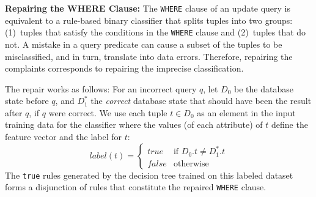\noindent
\textbf{Repairing the WHERE Clause:}
The \texttt{WHERE} clause of an update query is equivalent to a
rule-based binary classifier that splits tuples into two groups:
(1)~tuples that satisfy the conditions in the \texttt{WHERE} clause
and (2)~tuples that do not. A mistake in a query predicate can 
cause a subset of the tuples to be misclassified, and in turn,
translate into data errors. 
Therefore, repairing the complaints corresponds to repairing the imprecise classification. 

The repair works as follows: For an incorrect query $q$, let
$D_0$ be the database state before $q$, and $D_1^*$ the \emph{correct}
database state that should have been the result after $q$, if $q$ were correct.
We use each tuple $t \in D_0$ as an element in the input training data
for the classifier where the values (of each attribute) of $t$ define
the feature vector and the label for $t$:
	\[
    label(t)= 
    \begin{cases}
    true & \textrm{if\ }D_0.t \neq D_1^*.t\\
    false              & \text{otherwise}
    \end{cases}
\]
The \texttt{true} rules generated by the decision tree trained on this labeled dataset 
forms a disjunction of rules that constitute the repaired \texttt{WHERE} clause.


